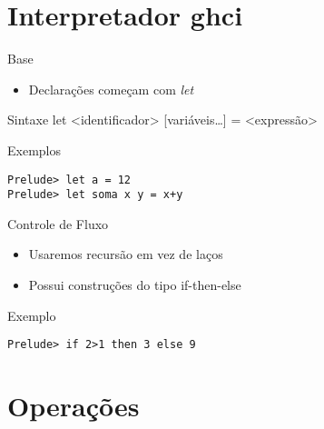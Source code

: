 \documentclass{beamer}
\begin{document}
\section{Interpretador ghci}

		\begin{frame}{}
		\end{frame}

	\begin{frame}[fragile]{Base}
	 	 \begin{itemize}
	 	  \item Declarações começam com \textit{let}
	 	 \end{itemize}
	 	 \begin{block}{Sintaxe}
	 	  let <identificador> {[}variáveis\dots{]} = <expressão>
	 	 \end{block}
	 	 \begin{block}{Exemplos}
	 	  \begin{lstlisting}
Prelude> let a = 12
Prelude> let soma x y = x+y
	 	  \end{lstlisting}
	 	 \end{block}
	\end{frame}
	
	\begin{frame}[fragile]{Controle de Fluxo}
		\begin{itemize}
		 \item Usaremos recursão em vez de laços
		 \item Possui construções do tipo if-then-else
		\end{itemize}
		
		\begin{block}{Exemplo}
		 \begin{lstlisting}
Prelude> if 2>1 then 3 else 9
		 \end{lstlisting}
		\end{block}
	\end{frame}
	
	\section{Operações}
	
	\begin{frame}{}
	\end{frame}
	
\end{document}
